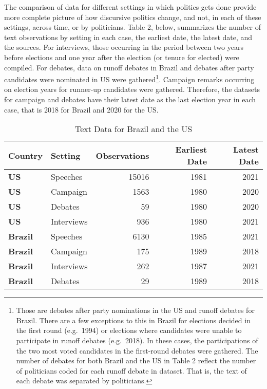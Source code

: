\documentclass[
  12pt,
]{article}
\begin{document}
The comparison of data for different settings in which politics gets
done provide more complete picture of how discursive politics change,
and not, in each of these settings, across time, or by politicians.
Table 2, below, summarizes the number of text observations by setting in
each case, the earliest date, the latest date, and the sources. For
interviews, those occurring in the period between two years before
elections and one year after the election (or tenure for elected) were
compiled. For debates, data on runoff debates in Brazil and debates
after party candidates were nominated in US were gathered\footnote{
  Those are debates after party nominations in the US and runoff debates
  for Brazil. There are a few exceptions to this in Brazil for elections
  decided in the first round (e.g.~1994) or elections where candidates
  were unable to participate in runoff debates (e.g.~2018). In these
  cases, the participations of the two most voted candidates in the
  first-round debates were gathered. The number of debates for both
  Brazil and the US in Table 2 reflect the number of politicians coded
  for each runoff debate in dataset. That is, the text of each debate
  was separated by politicians.}. Campaign remarks occurring on election
years for runner-up candidates were gathered. Therefore, the datasets
for campaign and debates have their latest date as the last election
year in each case, that is 2018 for Brazil and 2020 for the US.

\begin{table}[H]

\caption{\label{tab:table 2}Text Data for Brazil and the US}
\centering
\begin{tabular}[t]{>{}llrrr}
\toprule
Country & Setting & Observations & Earliest Date & Latest Date\\
\midrule
\textbf{US} & Speeches & 15016 & 1981 & 2021\\
\textbf{US} & Campaign & 1563 & 1980 & 2020\\
\textbf{US} & Debates & 59 & 1980 & 2020\\
\textbf{US} & Interviews & 936 & 1980 & 2021\\
\textbf{Brazil} & Speeches & 6130 & 1985 & 2021\\
\addlinespace
\textbf{Brazil} & Campaign & 175 & 1989 & 2018\\
\textbf{Brazil} & Interviews & 262 & 1987 & 2021\\
\textbf{Brazil} & Debates & 29 & 1989 & 2018\\
\bottomrule
\end{tabular}
\end{table}
\end{document}
